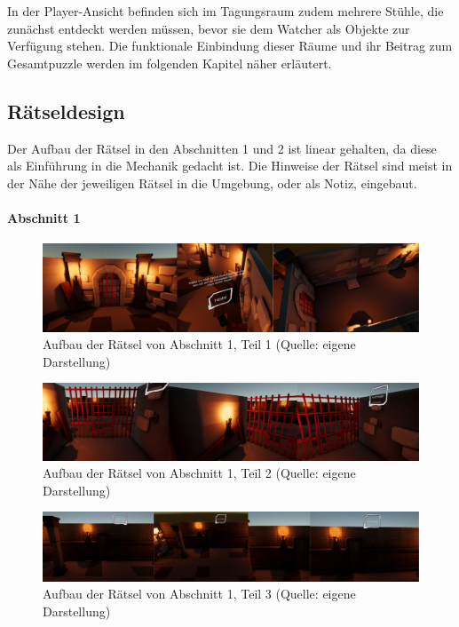 In der Player-Ansicht befinden sich im Tagungsraum zudem mehrere Stühle, die zunächst entdeckt werden müssen, bevor sie dem Watcher als Objekte zur Verfügung stehen. Die funktionale Einbindung dieser Räume und ihr Beitrag zum Gesamtpuzzle werden im folgenden Kapitel \emph{} näher erläutert.

\subsection{Rätseldesign}\label{sec:riddles}
Der Aufbau der Rätsel in den Abschnitten 1 und 2 ist linear gehalten, da diese als Einführung in die Mechanik gedacht ist. Die Hinweise der Rätsel sind meist in der Nähe der jeweiligen Rätsel in die Umgebung, oder als Notiz, eingebaut.

\paragraph{Abschnitt 1}

\begin{figure}[ht]
\centering
\includegraphics[width=1\linewidth]{content/pictures/Rätseldesign - Abschnitt00 - Rätsel00.png}
\caption{Aufbau der Rätsel von Abschnitt 1, Teil 1 (Quelle: eigene Darstellung)}
\label{fig:riddle-design-section00-00}
\end{figure}

\begin{figure}[ht]
\centering
\includegraphics[width=1\linewidth]{content/pictures/Rätseldesign - Abschnitt00 - Rätsel01.png}
\caption{Aufbau der Rätsel von Abschnitt 1, Teil 2 (Quelle: eigene Darstellung)}
\label{fig:riddle-design-section00-01}
\end{figure}

\begin{figure}[ht]
\centering
\includegraphics[width=1\linewidth]{content/pictures/Rätseldesign - Abschnitt00 - Rätsel02.png}
\caption{Aufbau der Rätsel von Abschnitt 1, Teil 3 (Quelle: eigene Darstellung)}
\label{fig:riddle-design-section00-02}
\end{figure}

